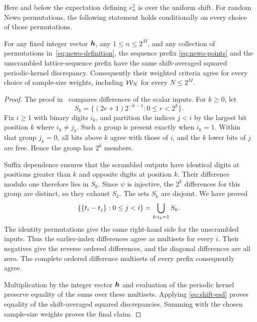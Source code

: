 Here and below the expectation defining $e_n^2$ is over the uniform shift.
For random Newo permutations, the following statement holds conditionally
on every choice of those permutations.

\begin{theorem}
\label{thm:newo-invariance}
For any fixed integer vector $\boldsymbol{h}$, any $1\le n\le2^M$, and any collection
of permutations in~\eqref{eq:newo-definition}, the sequence prefix
\eqref{eq:newo-points} and the unscrambled lattice-sequence prefix have the
same shift-averaged squared periodic-kernel discrepancy. Consequently their
weighted criteria agree for every choice of sample-size weights, including
$\mathcal W_N$ for every $N\le2^M$.
\end{theorem}

\begin{proof}
The proof in~\cite{pride-notes} compares differences of the scalar inputs.
For $k\ge0$, let
\[
 S_k=\{(2r+1)2^{-k-1}:0\le r<2^k\}.
\]
Fix $i\ge1$ with binary digits $i_k$, and partition the indices $j<i$ by
the largest bit position $k$ where $i_k\ne j_k$. Such a group is present
exactly when $i_k=1$. Within that group $j_k=0$, all bits above $k$ agree
with those of $i$, and the $k$ lower bits of $j$ are free. Hence the group
has $2^k$ members.

Suffix dependence ensures that the scrambled outputs have identical digits
at positions greater than $k$ and opposite digits at position $k$.
Their difference modulo one therefore lies in $S_k$. Since $\psi$ is
injective, the $2^k$ differences for this group are distinct, so they exhaust
$S_k$. The sets $S_k$ are disjoint. We have proved
\begin{equation}\label{eq:newo-row}
 \{\{t_i-t_j\}:0\le j<i\}
   =\bigcup_{k:i_k=1}S_k.
\end{equation}
The identity permutations give the same right-hand side for the
unscrambled inputs. Thus the earlier-index differences agree as multisets
for every $i$. Their negatives give the reverse ordered differences, and
the diagonal differences are all zero. The complete ordered difference
multisets of every prefix consequently agree.

Multiplication by the integer vector $\boldsymbol{h}$ and evaluation of the periodic
kernel preserve equality of the sums over these multisets. Applying
\eqref{eq:shift-esd} proves equality of the shift-averaged squared
discrepancies. Summing with the chosen sample-size weights proves the final
claim.
\end{proof}

